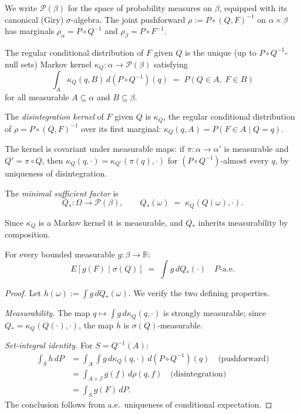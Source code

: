 We write $\mathcal{P}(\beta)$ for the space of probability measures on $\beta$,
equipped with its canonical (Giry) $\sigma$-algebra.  The joint pushforward
$\rho := P \circ (Q, F)^{-1}$ on $\alpha \times \beta$ has marginals
$\rho_\alpha = P \circ Q^{-1}$ and $\rho_\beta = P \circ F^{-1}$.

The regular conditional distribution of $F$ given $Q$ is the unique
(up to $P \circ Q^{-1}$-null sets) Markov kernel
$\kappa_Q : \alpha \to \mathcal{P}(\beta)$ satisfying
\[
  \int_A \kappa_Q(q, B)\, d(P \circ Q^{-1})(q) \;=\; P(Q \in A,\; F \in B)
\]
for all measurable $A \subseteq \alpha$ and $B \subseteq \beta$.

\begin{definition}
\label{II:def:predictive-kernel}
The \emph{disintegration kernel} of $F$ given $Q$ is $\kappa_Q$, the
regular conditional distribution of $\rho = P \circ (Q, F)^{-1}$ over
its first marginal:
$\kappa_Q(q, A) = P(F \in A \mid Q = q)$.
\end{definition}

The kernel is covariant under measurable maps: if $\pi : \alpha \to \alpha'$ is
measurable and $Q' = \pi \circ Q$, then $\kappa_Q(q, \cdot) = \kappa_{Q'}(\pi(q), \cdot)$
for $(P \circ Q^{-1})$-almost every $q$, by uniqueness of disintegration.

\begin{definition}
\label{II:def:minimal-predictive}
The \emph{minimal sufficient factor} is
\[
  Q_* : \Omega \to \mathcal{P}(\beta), \qquad Q_*(\omega) \;=\; \kappa_Q(Q(\omega), \cdot).
\]
\end{definition}

Since $\kappa_Q$ is a Markov kernel it is measurable, and $Q_*$ inherits
measurability by composition.

\begin{theorem}
\label{II:thm:predictive-factorization}
For every bounded measurable $g : \beta \to \mathbb{R}$:
\[
  E[g(F) \mid \sigma(Q)] \;=\; \int g\, dQ_*(\cdot)
  \quad P\text{-a.e.}
\]
\end{theorem}
\begin{proof}
Let $h(\omega) := \int g\, dQ_*(\omega)$.  We verify the two defining properties.

\emph{Measurability.}  The map $q \mapsto \int g\, d\kappa_Q(q, \cdot)$ is
strongly measurable; since $Q_* = \kappa_Q(Q(\cdot), \cdot)$, the map $h$ is
$\sigma(Q)$-measurable.

\emph{Set-integral identity.}  For $S = Q^{-1}(A)$:
\begin{align*}
  \int_S h\, dP
  &= \int_A \int g\, d\kappa_Q(q, \cdot)\, d(P \circ Q^{-1})(q)
  \quad\text{(pushforward)} \\
  &= \int_{A \times \beta} g(f)\, d\rho(q, f)
  \quad\text{(disintegration)} \\
  &= \int_S g(F)\, dP.
\end{align*}
The conclusion follows from a.e.\ uniqueness of conditional expectation.
\end{proof}

